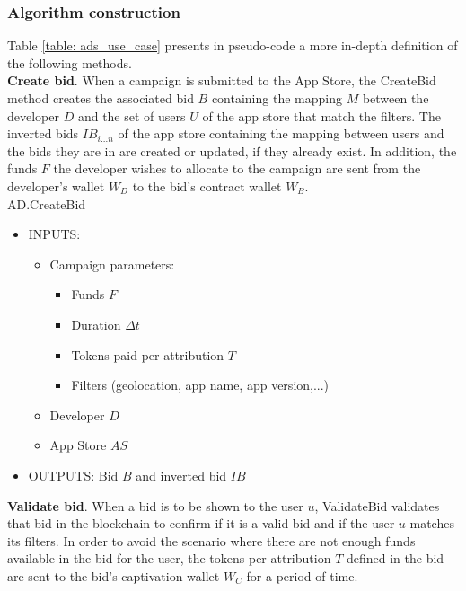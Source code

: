 \vspace{0.2cm}

\subsubsection{Algorithm construction}

Table \ref{table: ads_use_case} presents in pseudo-code a more in-depth definition of the following methods. \\

\noindent \textbf{Create bid}. When a campaign is submitted to the App Store, the \textsf{CreateBid} method creates the associated bid $B$ containing the mapping $M$ between the developer $D$ and the set of users $U$ of the app store that match the filters. The inverted bids $IB_{i...n}$ of the app store containing the mapping between users and the bids they are in are created or updated, if they already exist. In addition, the funds $F$ the developer wishes to allocate to the campaign are sent from the developer's wallet $W_D$ to the bid's contract wallet $W_B$. \\

\textsf{AD.CreateBid}
\begin{itemize}
	\item INPUTS:
	\begin{itemize}
		\item Campaign parameters:
		\begin{itemize}
			\item Funds $F$
			\item Duration $\Delta t$
			\item Tokens paid per attribution $T$
			\item Filters (geolocation, app name, app version,...)
		\end{itemize}
		\item Developer $D$
		\item App Store $AS$
	\end{itemize}
	\item OUTPUTS: Bid $B$ and inverted bid $IB$
\end{itemize}

\noindent \textbf{Validate bid}. When a bid is to be shown to the user $u$, \textsf{ValidateBid} validates that bid in the blockchain to confirm if it is a valid bid and if the user $u$ matches its filters. In order to avoid the scenario where there are not enough funds available in the bid for the user, the tokens per attribution $T$ defined in the bid are sent to the bid's captivation wallet $W_C$ for a period of time. \\

